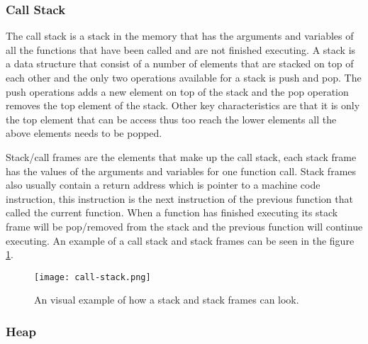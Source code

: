 \subsubsection{Call Stack}
The call stack is a stack in the memory that has the arguments and variables of all the functions that have been called and are not finished executing.
A stack is a data structure that consist of a number of elements that are stacked on top of each other and the only two operations available for a stack is push and pop.
The push operations adds a new element on top of the stack and the pop operation removes the top element of the stack.
Other key characteristics are that it is only the top element that can be access thus too reach the lower elements all the above elements needs to be popped.


Stack/call frames are the elements that make up the call stack, each stack frame has the values of the arguments and variables for one function call.
Stack frames also usually contain a return address which is pointer to a machine code instruction, this instruction is the next instruction of the previous function that called the current function.
When a function has finished executing its stack frame will be pop/removed from the stack and the previous function will continue executing. 
An example of a call stack and stack frames can be seen in the figure \ref{fig:callstack}.


\begin{figure}[h]
	\centering
	\texttt{[image: call-stack.png]}
	\caption{An visual example of how a stack and stack frames can look.}
	\label{fig:callstack}
\end{figure}


\subsubsection{Heap}


